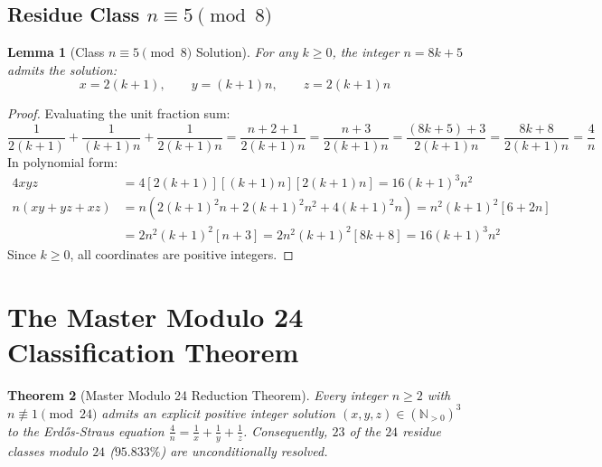 \documentclass[11pt,a4paper]{article}
\newtheorem{theorem}{Theorem}[section]
\newtheorem{lemma}[theorem]{Lemma}
\theoremstyle{definition}
\begin{document}
\subsection{Residue Class \texorpdfstring{$n \equiv 5 \pmod 8$}{n = 5 mod 8}}

\begin{lemma}[Class $n \equiv 5 \pmod 8$ Solution]\label{lem:mod8_5}
For any $k \ge 0$, the integer $n = 8k + 5$ admits the solution:
\begin{equation}\label{eq:sol_mod8_5}
x = 2(k + 1), \qquad y = (k + 1)n, \qquad z = 2(k + 1)n
\end{equation}
\end{lemma}

\begin{proof}
Evaluating the unit fraction sum:
\[ \frac{1}{2(k+1)} + \frac{1}{(k+1)n} + \frac{1}{2(k+1)n} = \frac{n + 2 + 1}{2(k+1)n} = \frac{n + 3}{2(k+1)n} = \frac{(8k+5) + 3}{2(k+1)n} = \frac{8k+8}{2(k+1)n} = \frac{4}{n} \]
In polynomial form:
\begin{align*}
4 x y z &= 4 [2(k+1)] [(k+1)n] [2(k+1)n] = 16 (k+1)^3 n^2 \\
n (x y + y z + x z) &= n \left( 2(k+1)^2 n + 2(k+1)^2 n^2 + 4(k+1)^2 n \right) = n^2 (k+1)^2 [ 6 + 2n ] \\
&= 2 n^2 (k+1)^2 [ n + 3 ] = 2 n^2 (k+1)^2 [ 8k + 8 ] = 16 (k+1)^3 n^2
\end{align*}
Since $k \ge 0$, all coordinates are positive integers.
\end{proof}

\section{The Master Modulo 24 Classification Theorem}

\begin{theorem}[Master Modulo 24 Reduction Theorem]\label{thm:master_24}
Every integer $n \ge 2$ with $n \not\equiv 1 \pmod{24}$ admits an explicit positive integer solution $(x, y, z) \in (\mathbb{N}_{>0})^3$ to the Erd\H{o}s-Straus equation $\frac{4}{n} = \frac{1}{x} + \frac{1}{y} + \frac{1}{z}$.
Consequently, $23$ of the $24$ residue classes modulo $24$ ($95.833\%$) are unconditionally resolved.
\end{theorem}
\end{document}
